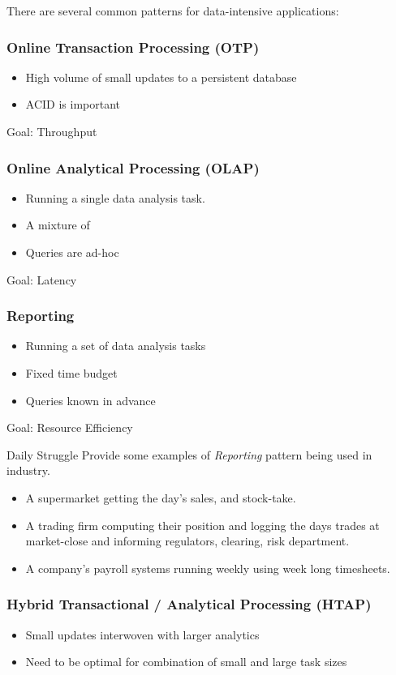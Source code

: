 There are several common patterns for data-intensive applications:
\subsubsection{Online Transaction Processing (OTP)}
\begin{itemize}
    \item High volume of small updates to a persistent database
    \item ACID is important
\end{itemize}
Goal: Throughput

\subsubsection{Online Analytical Processing (OLAP)}
\begin{itemize}
    \item Running a single data analysis task.
    \item A mixture of 
    \item Queries are ad-hoc
\end{itemize}
Goal: Latency

\subsubsection{Reporting}
\begin{itemize}
    \item Running a set of data analysis tasks
    \item Fixed time budget
    \item Queries known in advance
\end{itemize}
Goal: Resource Efficiency
\begin{examplebox}{Daily Struggle}
    Provide some examples of \textit{Reporting} pattern being used in industry.
    \tcblower
    \begin{itemize}
        \item A supermarket getting the day's sales, and stock-take.
        \item A trading firm computing their position and logging the days trades at market-close and informing regulators, clearing, risk department.
        \item A company's payroll systems running weekly using week long timesheets.
    \end{itemize}
\end{examplebox}

\subsubsection{Hybrid Transactional / Analytical Processing (HTAP)}
\begin{itemize}
    \item Small updates interwoven with larger analytics
    \item Need to be optimal for combination of small and large task sizes
\end{itemize}

